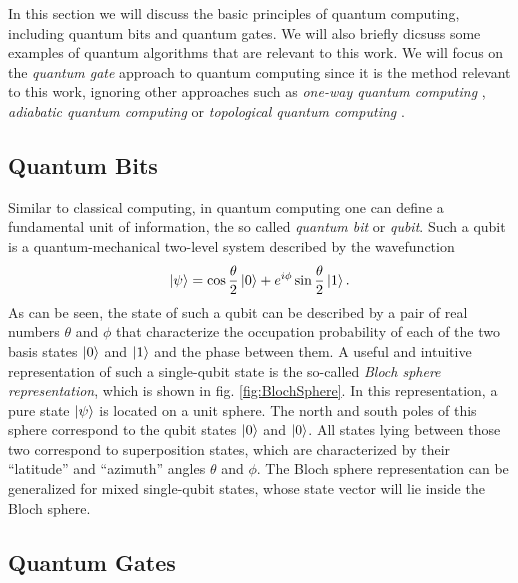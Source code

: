 In this section we will discuss the basic principles of quantum computing, including quantum bits and quantum gates. We will also briefly dicsuss some examples of quantum algorithms that are relevant to this work. We will focus on the {\it quantum gate} approach to quantum computing since it is the method relevant to this work, ignoring other approaches such as {\it one-way quantum computing} \citep{raussendorf_one-way_2001}, {\it adiabatic quantum computing} \citep{farhi_quantum_2000} or {\it topological quantum computing} \citep{kitaev_fault-tolerant_2003}.

\subsection{Quantum Bits}

Similar to classical computing, in quantum computing one can define a fundamental unit of information, the so called {\it quantum bit} or {\it qubit}. Such a qubit is a quantum-mechanical two-level system described by the wavefunction
%
\begin{equation}
\left| \psi \right> = \cos{\frac{\theta}{2}}\left| 0 \right>+e^{i\phi}\sin{\frac{\theta}{2}}\left| 1 \right>.
\end{equation}
%
As can be seen, the state of such a qubit can be described by a pair of real numbers $\theta$ and $\phi$ that characterize the occupation probability of each of the two basis states $\left| 0 \right>$ and $\left| 1 \right>$ and the phase between them. A useful and intuitive representation of such a single-qubit state is the so-called {\it Bloch sphere representation}, which is shown in fig. \ref{fig:BlochSphere}. In this representation, a pure state $\left| \psi \right>$ is located on a unit sphere. The north and south poles of this sphere correspond to the qubit states $\left| 0 \right>$ and $\left| 0 \right>$. All states lying between those two correspond to superposition states, which are characterized by their ``latitude'' and ``azimuth'' angles $\theta$ and $\phi$. The Bloch sphere representation can be generalized for mixed single-qubit states, whose state vector will lie inside the Bloch sphere.

\subsection{Quantum Gates}

